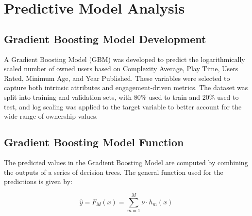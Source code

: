 \documentclass{article}
\begin{document}

\section{Predictive Model Analysis}
\subsection{Gradient Boosting Model Development}
A Gradient Boosting Model (GBM) was developed to predict the logarithmically scaled number of owned users based on Complexity Average, Play Time, Users Rated, Minimum Age, and Year Published. These variables were selected to capture both intrinsic attributes and engagement-driven metrics. The dataset was split into training and validation sets, with 80\% used to train and 20\% used to test, and log scaling was applied to the target variable to better account for the wide range of ownership values.

\subsection{Gradient Boosting Model Function}
The predicted values in the Gradient Boosting Model are computed by combining the outputs of a series of decision trees. The general function used for the predictions is given by:

\[
\hat{y} = F_M(x) = \sum_{m=1}^M \nu \cdot h_m(x)
\]
\end{document}
